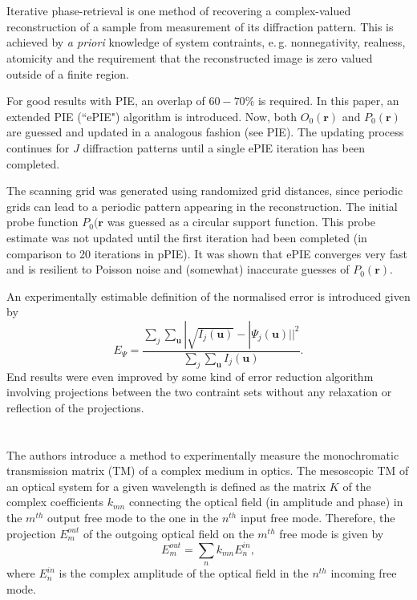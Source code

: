 \documentclass{article}
\begin{document}
\section{\cite{Maiden2009-pn} }

Iterative phase-retrieval is one method of recovering a complex-valued reconstruction of a sample from measurement of its diffraction pattern. This is achieved by \textit{a priori} knowledge of system contraints, e.\,g. nonnegativity, realness, atomicity and the requirement that the reconstructed image is zero valued outside of a finite region.

For good results with PIE, an overlap of $60-70\%$ is required. In this paper, an extended PIE (``ePIE") algorithm is introduced. Now, both $O_0(\bm{r})$ and $P_0(\bm{r})$ are guessed and updated in a analogous fashion (see PIE). The updating process continues for $J$ diffraction patterns until a single ePIE iteration has been completed. 

The scanning grid was generated using randomized grid distances, since periodic grids can lead to a periodic pattern appearing in the reconstruction. The initial probe function $P_0(\bm{r}$ was guessed as a circular support function. This probe estimate was not updated until the first iteration had been completed (in comparison to 20 iterations in pPIE). It was shown that ePIE converges very fast and is resilient to Poisson noise and (somewhat) inaccurate guesses of $P_0(\bm{r})$.

An experimentally estimable definition of the normalised error is introduced given by
\begin{equation}
    E_\Psi =\frac{\sum_{j}^{} \sum_{\bm{u}}^{} |\sqrt{I_j(\bm{u})}-|\Psi_j(\bm{u})||^2}
    {\sum_{j}^{} \sum_{\bm{u}}^{} I_j(\bm{u})}.
\end{equation}
End results were even improved by some kind of error reduction algorithm involving projections between the two contraint sets without any relaxation or reflection of the projections.





\section{\cite{Popoff2009-xs} }
The authors introduce  a  method  to  experimentally  measure  the  monochromatic  transmission  matrix (TM)  of  a  complex medium in optics.
The mesoscopic TM of an optical system for a given wavelength is defined as the matrix $K$ of the complex coefficients $k_{mn}$ connecting the optical field (in amplitude and phase) in the $m^{th}$ output free mode to the one in the $n^{th}$ input free mode. Therefore, the projection $E_m^{out}$ of the outgoing optical field on the $m^{th}$ free mode is given by
\begin{equation}
    E_m^{out}=\sum_n k_{mn} E_n^{in},
\end{equation}
where $E_n^{in}$ is the complex amplitude of the optical field in the $n^{th}$ incoming free mode.
\end{document}
